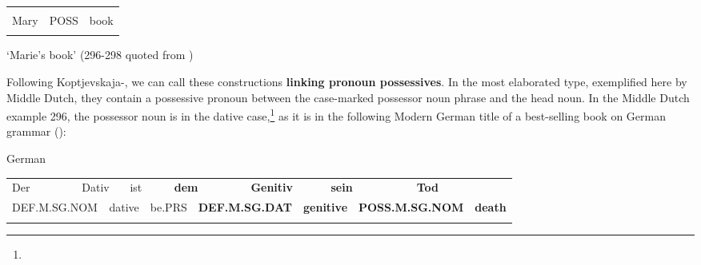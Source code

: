 \begin{tabular}{lll}
\lsptoprule
\multicolumn{3}{l}{Marie

}\\
Mary & POSS & book\\
\lspbottomrule
\end{tabular}

\begin{styleTranslation}
‘Marie’s book’ (296{}-298 quoted from \citet[56]{Norde1997})

\end{styleTranslation}

\begin{styleBodyTextFirst}
Following Koptjevskaja-\citet{Tamm2003}, we can call these constructions \textbf{linking pronoun possessives}. In the most elaborated type, exemplified here by Middle Dutch, they contain a possessive pronoun between the case-marked possessor noun phrase and the head noun. In the Middle Dutch example 296, the possessor noun is in the dative case,\footnote{} as it is in the following Modern German title of a best-selling book on German grammar (\citet{Sick2004}):

\end{styleBodyTextFirst}

\begin{listWWNumileveli}
\item 

\begin{styleExample}
\label{bkm:Ref126571195}German

\end{styleExample}

\end{listWWNumileveli}

\begin{tabular}{llllllllllllll}
\lsptoprule
Der & \multicolumn{2}{l}{Dativ

} & \multicolumn{2}{l}{ist

} & \multicolumn{2}{l}{{\bfseries dem}

} & \multicolumn{2}{l}{{\bfseries Genitiv}

} & \multicolumn{2}{l}{{\bfseries sein}

} & \multicolumn{2}{l}{{\bfseries Tod}

} & \\
\multicolumn{2}{l}{DEF.M.SG.NOM

} & \multicolumn{2}{l}{dative

} & \multicolumn{2}{l}{be.PRS

} & \multicolumn{2}{l}{{\bfseries DEF.M.SG.DAT}

} & \multicolumn{2}{l}{{\bfseries genitive}

} & \multicolumn{2}{l}{{\bfseries POSS.M.SG.NOM}

} & \multicolumn{2}{l}{{\bfseries death}

}\\
\lspbottomrule
\end{tabular}

